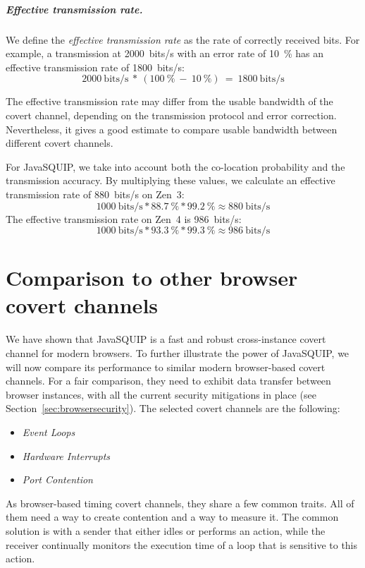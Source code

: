\documentclass[11pt,
  titlepage=false,
  parskip=half,      %
]{scrreprt}
\begin{document}
\paragraph{Effective transmission rate.}
We define the \textit{effective transmission rate} as the rate of correctly received bits.
For example, a transmission at 2000~bits/s with an error rate of 10~\%
has an effective transmission rate of 1800~bits/s:
\[2000~\text{bits/s}~*~(100~\%~-~10~\%)~=~1800~\text{bits/s}\]

The effective transmission rate may differ from the usable bandwidth of the covert channel,
depending on the transmission protocol and error correction.
Nevertheless, it gives a good estimate to compare usable bandwidth between different covert channels.

For JavaSQUIP, we take into account both the co-location probability and the transmission accuracy.
By multiplying these values, we calculate an effective transmission rate of 880~bits/s on Zen~3:
\[1000~\text{bits/s} * 88.7~\% * 99.2~\% \approx 880~\text{bits/s}\]
The effective transmission rate on Zen~4 is 986~bits/s:
\[1000~\text{bits/s} * 93.3~\% * 99.3~\% \approx 986~\text{bits/s}\]

\chapter{Comparison to other browser covert channels}
\label{ch:comparison}
We have shown that JavaSQUIP is a fast and robust cross-instance covert channel for modern browsers.
To further illustrate the power of JavaSQUIP,
we will now compare its performance to similar modern browser-based covert channels.
For a fair comparison, they need to exhibit data transfer between browser instances,
with all the current security mitigations in place (see Section~\ref{sec:browsersecurity}).
The selected covert channels are the following:

\begin{itemize}
    \item \textit{Event Loops}~\cite{vila2017loophole}
    \item \textit{Hardware Interrupts}~\cite{lipp2017practical}
    \item \textit{Port Contention}~\cite{Rokicki2022webport}
\end{itemize}

As browser-based timing covert channels, they share a few common traits.
All of them need a way to create contention and a way to measure it.
The common solution is with a sender that either idles or performs an action,
while the receiver continually monitors the execution time of a loop that is sensitive to this action.
\end{document}
